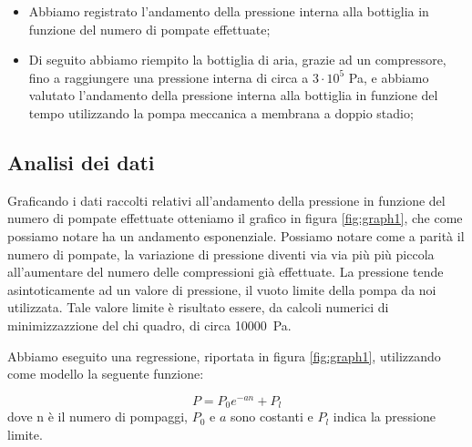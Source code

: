 \begin{itemize}
	\item{Abbiamo registrato l'andamento della pressione interna alla bottiglia in funzione del numero di pompate effettuate;}
	\item{Di seguito abbiamo riempito la bottiglia di aria, grazie ad un compressore, fino a raggiungere una pressione
	interna di circa a $3 \cdot 10^5$ \si{\pascal}, e abbiamo valutato l'andamento della pressione interna alla bottiglia
	in funzione del tempo utilizzando la pompa meccanica a membrana a doppio stadio;}
\end{itemize}

\subsection{Analisi dei dati}

Graficando i dati raccolti relativi all'andamento della pressione in funzione del numero di pompate effettuate otteniamo
il grafico in figura \ref{fig:graph1}, che come possiamo notare ha un andamento esponenziale. Possiamo notare come a parità
il numero di pompate, la variazione di pressione diventi via via più più piccola all'aumentare del numero delle
compressioni già effettuate. La pressione tende asintoticamente ad un valore di pressione, il vuoto limite della pompa
da noi utilizzata. Tale valore limite è risultato essere, da calcoli numerici di minimizzazzione del chi quadro, di circa \SI{10000}{\pascal}.

Abbiamo eseguito una regressione, riportata in figura \ref{fig:graph1}, utilizzando come modello la seguente funzione:

\begin{equation}
    P = P_0 e^{-an} + P_l
\end{equation}
%
dove n è il numero di pompaggi, $P_0$ e $a$ sono costanti e $P_l$ indica la pressione limite.

